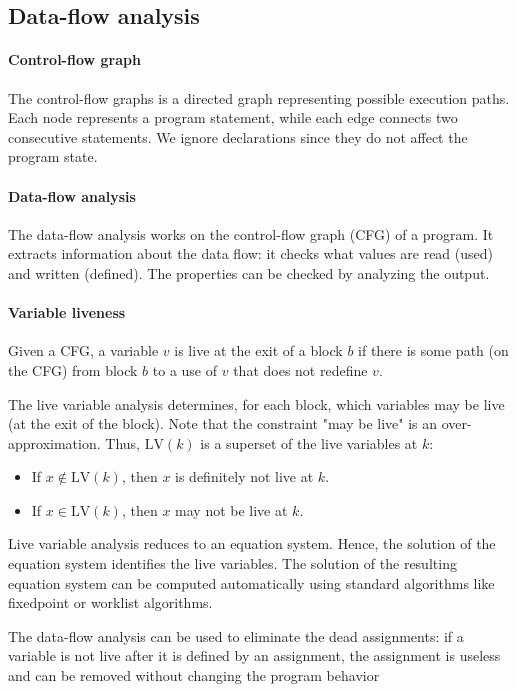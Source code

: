 \subsection{Data-flow analysis}

\paragraph*{Control-flow graph}
The control-flow graphs is a directed graph representing possible execution paths. 
Each node represents a program statement, while each edge connects two consecutive statements. 
We ignore declarations since they do not affect the program state. 

\paragraph*{Data-flow analysis}
The data-flow analysis works on the control-flow graph (CFG) of a program. 
It extracts information about the data flow: it checks what values are read (used) and written (defined). 
The properties can be checked by analyzing the output. 

\paragraph*{Variable liveness}
\begin{definition}
    Given a CFG, a variable $v$ is live at the exit of a block $b$ if there is some path (on the CFG) from block $b$ to a use of $v$ that does not redefine $v$.
\end{definition}
The live variable analysis determines, for each block, which variables may be live (at the exit of the block). 
Note that the constraint "may be live" is an over-approximation. 
Thus, $\text{LV}(k)$ is a superset of the live variables at $k$: 
\begin{itemize}
    \item If $x\notin\text{LV}(k)$, then $x$ is definitely not live at $k$. 
    \item If $x\in\text{LV}(k)$, then $x$ may not be live at $k$.
\end{itemize}
Live variable analysis reduces to an equation system. 
Hence, the solution of the equation system identifies the live variables. 
The solution of the resulting equation system can be computed automatically using standard algorithms like fixedpoint or worklist algorithms. 

The data-flow analysis can be used to eliminate the dead assignments: if a variable is not live after it is defined by an assignment, the assignment is useless and can be removed without changing the program behavior

